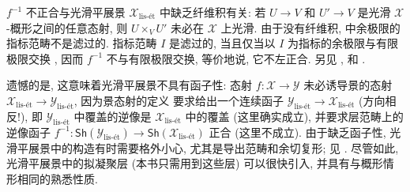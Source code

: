 \begin{caution}[缺乏函子性]\label{src:7.1.5}
$f^{-1}$ 不正合与光滑平展景 $\mathcal X_{\text{lis-ét}}$ 中缺乏纤维积有关: 若 $U\to V$ 和 $U'\to V$ 是光滑 $\mathcal X$-概形之间的任意态射, 则 $U\times_V U'$ 未必在 $\mathcal X$ 上光滑. 由于没有纤维积,  中余极限的指标范畴不是滤过的. 指标范畴 $I$ 是滤过的, 当且仅当以 $I$ 为指标的余极限与有限极限交换 \cite[Tag 002W]{SP}, 因而 $f^{-1}$ 不与有限极限交换, 等价地说, 它不左正合. 另见 \cite[Warning 5.3.12]{Beh03}, \cite[例 3.4]{Ols07} 和 \cite[Tag 07BF]{SP}.

遗憾的是, 这意味着光滑平展景不具有函子性: 态射 $f:\mathcal X\to\mathcal Y$ 未必诱导景的态射 $\mathcal X_{\text{lis-ét}}\to\mathcal Y_{\text{lis-ét}}$, 因为景态射的定义 \cite[Tag 00X0]{SP} 要求给出一个连续函子 $\mathcal Y_{\text{lis-ét}}\to\mathcal X_{\text{lis-ét}}$ (方向相反!), 即 $\mathcal Y_{\text{lis-ét}}$ 中覆盖的逆像是 $\mathcal X_{\text{lis-ét}}$ 中的覆盖 (这里确实成立), 并要求层范畴上的逆像函子 $f^{-1}:\mathsf{Sh}(\mathcal Y_{\text{lis-ét}})\to\mathsf{Sh}(\mathcal X_{\text{lis-ét}})$ 正合 (这里不成立). 由于缺乏函子性, 光滑平展景中的构造有时需要格外小心, 尤其是导出范畴和余切复形; 见 \cite{Ols07}. 尽管如此, 光滑平展景中的拟凝聚层 (本书只需用到这些层) 可以很快引入, 并具有与概形情形相同的熟悉性质.
\end{caution}

